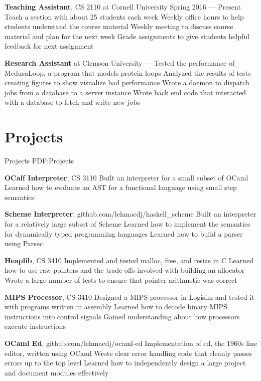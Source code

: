 \documentclass[letterpaper,10pt,oneside]{simpleresume}
\begin{document}
\begin{minipage}[t][0pt]{\linewidth}
\begin{body}
\textbf{Teaching Assistant}, CS 2110 at Cornell University
\hfill
Spring 2016 --- Present
\BulletItem%
Teach a section with about 25 students each week
\BulletItem%
Weekly office hours to help students understand the course material
\BulletItem%
Weekly meeting to discuss course material and plan for the next week
\BulletItem%
Grade assignments to give students helpful feedback for next assignment

\textbf{Research Assistant} at Clemson University
\hfill
{} --- 
\BulletItem%
Tested the performance of MedusaLoop, a program that models protein loops
\BulletItem%
Analyzed the results of tests creating figures to show visualize bad performance
\BulletItem%
Wrote a daemon to dispatch jobs from a database to a server instance
\BulletItem%
Wrote back end code that interacted with a database to fetch and write new jobs

\section%
{Projects}
{Projects}
{PDF:Projects}

\textbf{OCalf Interpreter}, CS 3110
\BulletItem%
Built an interpreter for a small subset of OCaml
\BulletItem%
Learned how to evaluate an AST for a functional language using small step
semantics

\textbf{Scheme Interpreter}, github.com/lehmacdj/haskell\_scheme
\BulletItem%
Built an interpreter for a relatively large subset of Scheme
\BulletItem%
Learned how to implement the semantics for dynamically typed programming
languages
\BulletItem%
Learned how to build a parser using Parsec

\textbf{Heaplib}, CS 3410
\BulletItem%
Implemented and tested malloc, free, and resize in C
\BulletItem%
Learned how to use raw pointers and the trade-offs involved with building
an allocator
\BulletItem%
Wrote a large number of tests to ensure that pointer arithmetic was correct

\textbf{MIPS Processor}, CS 3410
\BulletItem%
Designed a MIPS processor in Logisim and tested it with programs written in
assembly
\BulletItem%
Learned how to decode binary MIPS instructions into control signals
\BulletItem%
Gained understanding about how processors execute instructions

\textbf{OCaml Ed}, github.com/lehmacdj/ocaml-ed
\BulletItem%
Implementation of ed, the 1960s line editor, written using OCaml
\BulletItem%
Wrote clear error handling code that cleanly passes errors up to the top level
\BulletItem%
Learned how to independently design a large project and document modules
effectively


\end{body}
\end{minipage}
\end{document}
